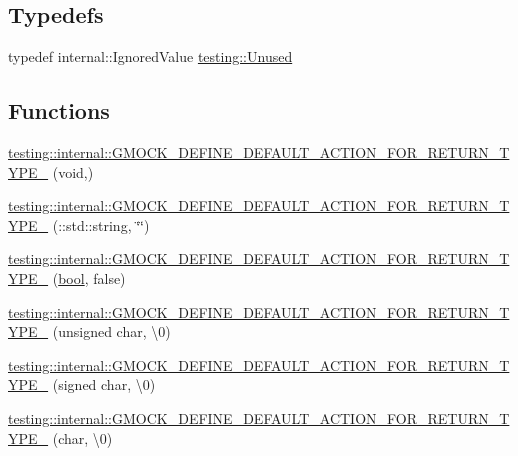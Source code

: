 \subsection*{Typedefs}
\begin{DoxyCompactItemize}
\item 
typedef internal\+::\+Ignored\+Value \hyperlink{namespacetesting_a603e329ec0263ebfcf16f712810bd511}{testing\+::\+Unused}
\end{DoxyCompactItemize}
\subsection*{Functions}
\begin{DoxyCompactItemize}
\item 
\hyperlink{namespacetesting_1_1internal_a8fe6f7c11d6d3dd6e42b75c9a5b43861}{testing\+::internal\+::\+G\+M\+O\+C\+K\+\_\+\+D\+E\+F\+I\+N\+E\+\_\+\+D\+E\+F\+A\+U\+L\+T\+\_\+\+A\+C\+T\+I\+O\+N\+\_\+\+F\+O\+R\+\_\+\+R\+E\+T\+U\+R\+N\+\_\+\+T\+Y\+P\+E\+\_\+} (void,)
\item 
\hyperlink{namespacetesting_1_1internal_a0a961f38f341d40237252babcb3767b7}{testing\+::internal\+::\+G\+M\+O\+C\+K\+\_\+\+D\+E\+F\+I\+N\+E\+\_\+\+D\+E\+F\+A\+U\+L\+T\+\_\+\+A\+C\+T\+I\+O\+N\+\_\+\+F\+O\+R\+\_\+\+R\+E\+T\+U\+R\+N\+\_\+\+T\+Y\+P\+E\+\_\+} (\+::std\+::string, \char`\"{}\char`\"{})
\item 
\hyperlink{namespacetesting_1_1internal_aa6670915f42119e4ba20d8cb74fc1eea}{testing\+::internal\+::\+G\+M\+O\+C\+K\+\_\+\+D\+E\+F\+I\+N\+E\+\_\+\+D\+E\+F\+A\+U\+L\+T\+\_\+\+A\+C\+T\+I\+O\+N\+\_\+\+F\+O\+R\+\_\+\+R\+E\+T\+U\+R\+N\+\_\+\+T\+Y\+P\+E\+\_\+} (\hyperlink{classbool}{bool}, false)
\item 
\hyperlink{namespacetesting_1_1internal_ab203e2c4c54f2ca86439344347a3e43f}{testing\+::internal\+::\+G\+M\+O\+C\+K\+\_\+\+D\+E\+F\+I\+N\+E\+\_\+\+D\+E\+F\+A\+U\+L\+T\+\_\+\+A\+C\+T\+I\+O\+N\+\_\+\+F\+O\+R\+\_\+\+R\+E\+T\+U\+R\+N\+\_\+\+T\+Y\+P\+E\+\_\+} (unsigned char, \textquotesingle{}\textbackslash{}0\textquotesingle{})
\item 
\hyperlink{namespacetesting_1_1internal_aaedb3b1b5307625bc84dc660742da3c6}{testing\+::internal\+::\+G\+M\+O\+C\+K\+\_\+\+D\+E\+F\+I\+N\+E\+\_\+\+D\+E\+F\+A\+U\+L\+T\+\_\+\+A\+C\+T\+I\+O\+N\+\_\+\+F\+O\+R\+\_\+\+R\+E\+T\+U\+R\+N\+\_\+\+T\+Y\+P\+E\+\_\+} (signed char, \textquotesingle{}\textbackslash{}0\textquotesingle{})
\item 
\hyperlink{namespacetesting_1_1internal_aeaaa7101572f283fe70a85ad5e6c65dc}{testing\+::internal\+::\+G\+M\+O\+C\+K\+\_\+\+D\+E\+F\+I\+N\+E\+\_\+\+D\+E\+F\+A\+U\+L\+T\+\_\+\+A\+C\+T\+I\+O\+N\+\_\+\+F\+O\+R\+\_\+\+R\+E\+T\+U\+R\+N\+\_\+\+T\+Y\+P\+E\+\_\+} (char, \textquotesingle{}\textbackslash{}0\textquotesingle{})

\end{DoxyCompactItemize}
